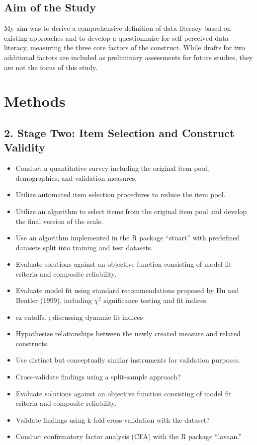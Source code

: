 \documentclass[
  12pt,
  a4paper,
  twoside]{article}
\providecommand{\tightlist}{%
  \setlength{\itemsep}{0pt}\setlength{\parskip}{0pt}}
\begin{document}
\subsection{Aim of the Study}\label{aim-of-the-study}

My aim was to derive a comprehensive definition of data literacy based on existing approaches and to develop a questionnaire for self-perceived data literacy, measuring the three core factors of the construct. While drafts for two additional factors are included as preliminary assessments for future studies, they are not the focus of this study.

\section{Methods}\label{methods}

\subsection{2. Stage Two: Item Selection and Construct Validity}\label{stage-two-item-selection-and-construct-validity}

\begin{itemize}
\tightlist
\item
  Conduct a quantitative survey including the original item pool, demographics, and validation measures.
\item
  Utilize automated item selection procedures to reduce the item pool.
\item
  Utilize an algorithm to select items from the original item pool and develop the final version of the scale.
\item
  Use an algorithm implemented in the R package ``stuart'' with predefined datasets split into training and test datasets.
\item
  Evaluate solutions against an objective function consisting of model fit criteria and composite reliability.
\item
  Evaluate model fit using standard recommendations proposed by Hu and Bentler (1999), including \(\chi^2\) significance testing and fit indices.
\item
  ez cutoffs. ; discussing dynamic fit indices
\item
  Hypothesize relationships between the newly created measure and related constructs.
\item
  Use distinct but conceptually similar instruments for validation purposes.
\item
  Cross-validate findings using a split-sample approach?
\item
  Evaluate solutions against an objective function consisting of model fit criteria and composite reliability.
\item
  Validate findings using k-fold cross-validation with the dataset?
\item
  Conduct confirmatory factor analysis (CFA) with the R package ``lavaan.''
\end{itemize}
\end{document}
